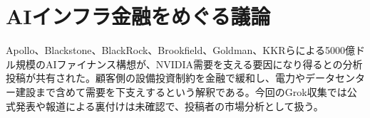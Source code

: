 \section{AIインフラ金融をめぐる議論}
Apollo、Blackstone、BlackRock、Brookfield、Goldman、KKRらによる5000億ドル規模のAIファイナンス構想が、NVIDIA需要を支える要因になり得るとの分析投稿が共有された。顧客側の設備投資制約を金融で緩和し、電力やデータセンター建設まで含めて需要を下支えするという解釈である。今回のGrok収集では公式発表や報道による裏付けは未確認で、投稿者の市場分析として扱う。
